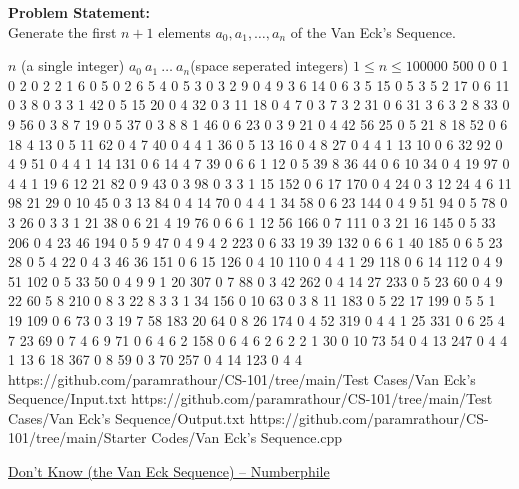 \textbf{Problem Statement:}\\
Generate the first $n+1$ elements $a_0,a_1,\ldots,a_n$ of the Van Eck's Sequence.
\begin{testcasesMore}
	{$n$ \hfill(a single integer)}
	{$a_0\ a_1\ \ldots\ a_n$\hfill(space seperated integers)}
	{$1 \leq n \leq 100000$}
	{500}
	{0 0 1 0 2 0 2 2 1 6 0 5 0 2 6 5 4 0 5 3 0 3 2 9 0 4 9 3 6 14 0 6 3 5 15 0 5 3 5 2 17 0 6 11 0 3 8 0 3 3 1 42 0 5 15 20 0 4 32 0 3 11 18 0 4 7 0 3 7 3 2 31 0 6 31 3 6 3 2 8 33 0 9 56 0 3 8 7 19 0 5 37 0 3 8 8 1 46 0 6 23 0 3 9 21 0 4 42 56 25 0 5 21 8 18 52 0 6 18 4 13 0 5 11 62 0 4 7 40 0 4 4 1 36 0 5 13 16 0 4 8 27 0 4 4 1 13 10 0 6 32 92 0 4 9 51 0 4 4 1 14 131 0 6 14 4 7 39 0 6 6 1 12 0 5 39 8 36 44 0 6 10 34 0 4 19 97 0 4 4 1 19 6 12 21 82 0 9 43 0 3 98 0 3 3 1 15 152 0 6 17 170 0 4 24 0 3 12 24 4 6 11 98 21 29 0 10 45 0 3 13 84 0 4 14 70 0 4 4 1 34 58 0 6 23 144 0 4 9 51 94 0 5 78 0 3 26 0 3 3 1 21 38 0 6 21 4 19 76 0 6 6 1 12 56 166 0 7 111 0 3 21 16 145 0 5 33 206 0 4 23 46 194 0 5 9 47 0 4 9 4 2 223 0 6 33 19 39 132 0 6 6 1 40 185 0 6 5 23 28 0 5 4 22 0 4 3 46 36 151 0 6 15 126 0 4 10 110 0 4 4 1 29 118 0 6 14 112 0 4 9 51 102 0 5 33 50 0 4 9 9 1 20 307 0 7 88 0 3 42 262 0 4 14 27 233 0 5 23 60 0 4 9 22 60 5 8 210 0 8 3 22 8 3 3 1 34 156 0 10 63 0 3 8 11 183 0 5 22 17 199 0 5 5 1 19 109 0 6 73 0 3 19 7 58 183 20 64 0 8 26 174 0 4 52 319 0 4 4 1 25 331 0 6 25 4 7 23 69 0 7 4 6 9 71 0 6 4 6 2 158 0 6 4 6 2 6 2 2 1 30 0 10 73 54 0 4 13 247 0 4 4 1 13 6 18 367 0 8 59 0 3 70 257 0 4 14 123 0 4 4}
	{https://github.com/paramrathour/CS-101/tree/main/Test Cases/Van Eck's Sequence/Input.txt}
	{https://github.com/paramrathour/CS-101/tree/main/Test Cases/Van Eck's Sequence/Output.txt}
	{https://github.com/paramrathour/CS-101/tree/main/Starter Codes/Van Eck's Sequence.cpp}
\end{testcasesMore}
\begin{funvideo}
	\href{https://youtu.be/etMJxB-igrc}{Don't Know (the Van Eck Sequence) -- Numberphile}
\end{funvideo}
